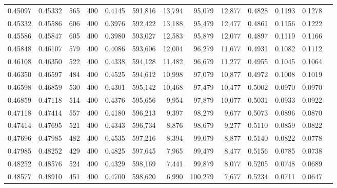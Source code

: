 \begin{tabular}{rrrrrrrrrrrrr}
0.45097 & 0.45332 &    565 & 400 &                                     0.4145 & 591,816 &  13,794 &  95,079 &  12,877 & 0.4828 & 0.1193 & 0.1278 \\
0.45332 & 0.45586 &    606 & 400 &                                     0.3976 & 592,422 &  13,188 &  95,479 &  12,477 & 0.4861 & 0.1156 & 0.1222 \\
0.45586 & 0.45847 &    605 & 400 &                                     0.3980 & 593,027 &  12,583 &  95,879 &  12,077 & 0.4897 & 0.1119 & 0.1166 \\
0.45848 & 0.46107 &    579 & 400 &                                     0.4086 & 593,606 &  12,004 &  96,279 &  11,677 & 0.4931 & 0.1082 & 0.1112 \\
0.46108 & 0.46350 &    522 & 400 &                                     0.4338 & 594,128 &  11,482 &  96,679 &  11,277 & 0.4955 & 0.1045 & 0.1064 \\
0.46350 & 0.46597 &    484 & 400 &                                     0.4525 & 594,612 &  10,998 &  97,079 &  10,877 & 0.4972 & 0.1008 & 0.1019 \\
0.46598 & 0.46859 &    530 & 400 &                                     0.4301 & 595,142 &  10,468 &  97,479 &  10,477 & 0.5002 & 0.0970 & 0.0970 \\
0.46859 & 0.47118 &    514 & 400 &                                     0.4376 & 595,656 &   9,954 &  97,879 &  10,077 & 0.5031 & 0.0933 & 0.0922 \\
0.47118 & 0.47414 &    557 & 400 &                                     0.4180 & 596,213 &   9,397 &  98,279 &   9,677 & 0.5073 & 0.0896 & 0.0870 \\
0.47414 & 0.47695 &    521 & 400 &                                     0.4343 & 596,734 &   8,876 &  98,679 &   9,277 & 0.5110 & 0.0859 & 0.0822 \\
0.47696 & 0.47985 &    482 & 400 &                                     0.4535 & 597,216 &   8,394 &  99,079 &   8,877 & 0.5140 & 0.0822 & 0.0778 \\
0.47985 & 0.48252 &    429 & 400 &                                     0.4825 & 597,645 &   7,965 &  99,479 &   8,477 & 0.5156 & 0.0785 & 0.0738 \\
0.48252 & 0.48576 &    524 & 400 &                                     0.4329 & 598,169 &   7,441 &  99,879 &   8,077 & 0.5205 & 0.0748 & 0.0689 \\
0.48577 & 0.48910 &    451 & 400 &                                     0.4700 & 598,620 &   6,990 & 100,279 &   7,677 & 0.5234 & 0.0711 & 0.0647 \\

\end{tabular}
